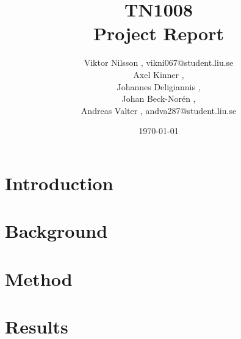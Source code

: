\documentclass[]{report}   %
\begin{document}
\title{TN1008\\ Project Report}   %
\author{
  Viktor Nilsson , vikni067@student.liu.se 
  \\Axel Kinner ,
  \\Johannes Deligiannis ,
  \\Johan Beck-Norén ,
  \\Andreas Valter , andva287@student.liu.se
	}
        \date{\today}    %
        \maketitle
        
\setcounter{page}{2}



\begingroup
\let\clearpage\relax %
\chapter{Introduction}


\chapter{Background}






\chapter{Method}

\chapter{Results}



\endgroup



\end{document}
